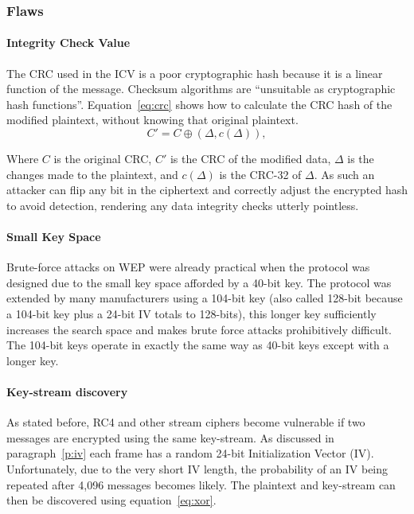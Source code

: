 \documentclass[pdftex, 11pt, a4paper]{article}
\begin{document}
\subsubsection{Flaws}
\paragraph{Integrity Check Value}
The CRC used in the ICV is a poor cryptographic hash because it is a linear function of the message. Checksum algorithms are ``unsuitable as cryptographic hash functions''\cite{wiki-crc}. Equation~\ref{eq:crc} shows how to calculate the CRC hash of the modified plaintext, without knowing that original plaintext.
\begin{equation}\label{eq:crc}
C'=C \oplus (\Delta ,c(\Delta)),
\end{equation}

Where $C$ is the original CRC, $C'$ is the CRC of the modified data, $\Delta$ is the changes made to the plaintext, and $c(\Delta)$ is the CRC-32 of $\Delta$.
As such an attacker can flip any bit in the ciphertext and correctly adjust the encrypted hash to avoid detection, rendering any data integrity checks utterly pointless.

\paragraph{Small Key Space}
Brute-force attacks on WEP were already practical when the protocol was designed due to the small key space afforded by a 40-bit key.  The protocol was extended by many manufacturers using a 104-bit key (also called 128-bit because a 104-bit key plus a 24-bit IV totals to 128-bits), this longer key sufficiently increases the search space and makes brute force attacks prohibitively difficult.  The 104-bit keys operate in exactly the same way as 40-bit keys except with a longer key.

\paragraph{Key-stream discovery}
As stated before, RC4 and other stream ciphers become vulnerable if two messages are encrypted using the same key-stream.  As discussed in paragraph~\ref{p:iv} each frame has a random 24-bit Initialization Vector (IV).  Unfortunately, due to the very short IV length, the probability of an IV being repeated after 4,096 messages becomes likely.  The plaintext and key-stream can then be discovered using equation~\ref{eq:xor}.
\end{document}
